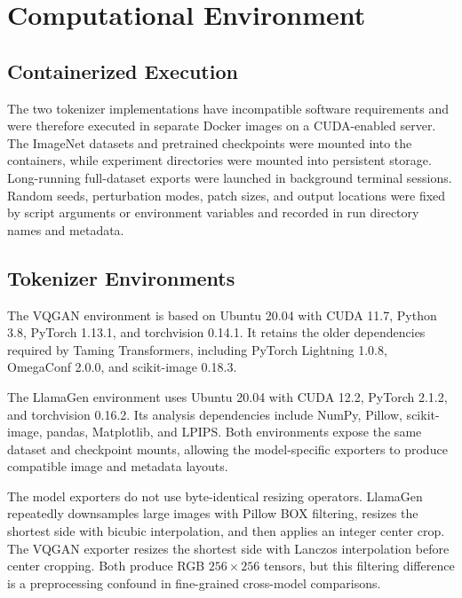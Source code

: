 \chapter{Computational Environment}
\label{app:computational_environment}

\section{Containerized Execution}
\label{sec:appendix_containerized_execution}

The two tokenizer implementations have incompatible software requirements and
were therefore executed in separate Docker images on a CUDA-enabled server.
The ImageNet datasets and pretrained checkpoints were mounted into the
containers, while experiment directories were mounted into persistent storage.
Long-running full-dataset exports were launched in background terminal
sessions. Random seeds, perturbation modes, patch sizes, and output locations
were fixed by script arguments or environment variables and recorded in run
directory names and metadata.

\section{Tokenizer Environments}
\label{sec:appendix_tokenizer_environments}

The VQGAN environment is based on Ubuntu 20.04 with CUDA 11.7, Python 3.8,
PyTorch 1.13.1, and torchvision 0.14.1. It retains the older dependencies
required by Taming Transformers, including PyTorch Lightning 1.0.8,
OmegaConf 2.0.0, and scikit-image 0.18.3.

The LlamaGen environment uses Ubuntu 20.04 with CUDA 12.2, PyTorch 2.1.2, and
torchvision 0.16.2. Its analysis dependencies include NumPy, Pillow,
scikit-image, pandas, Matplotlib, and LPIPS. Both environments expose the same
dataset and checkpoint mounts, allowing the model-specific exporters to
produce compatible image and metadata layouts.

The model exporters do not use byte-identical resizing operators. LlamaGen
repeatedly downsamples large images with Pillow BOX filtering, resizes the
shortest side with bicubic interpolation, and then applies an integer center
crop. The VQGAN exporter resizes the shortest side with Lanczos interpolation
before center cropping. Both produce RGB $256\times256$ tensors, but this
filtering difference is a preprocessing confound in fine-grained cross-model
comparisons.

